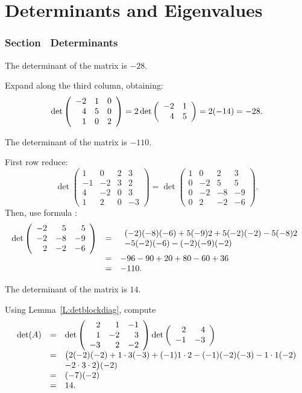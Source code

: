 \chapter{Determinants and Eigenvalues}

\subsection*{Section~\protect{\ref{S:det}} Determinants}

\ans The determinant of the matrix is $-28$.

\soln Expand along the third column, obtaining:
\[
\det\left(\begin{array}{rrr} -2 & 1 & 0 \\ 4 & 5 & 0 \\ 1 & 0 & 2\end{array}\right) = 2\det\left(\begin{array}{rr} -2 & 1\\ 4 &5\end{array}\right)
= 2(-14) = -28.
\]

\ans The determinant of the matrix is $-110$.

\soln First row reduce:
\[
\det\left(\begin{array}{rrrr}
1 & 0 & 2 & 3 \\ 
-1 & -2 & 3 & 2 \\
4 & -2 & 0 & 3 \\
1 & 2 & 0 & -3 \end{array}\right) =
\det\left(\begin{array}{rrrr}
1 & 0 & 2 & 3 \\ 
0 & -2 & 5 & 5 \\
0 & -2 & -8 & -9 \\
0 & 2 & -2 & -6 \end{array}\right).
\]
Then, use formula :
\[ \begin{array}{rcl}
\det\left(\begin{array}{rrr} -2 & 5 & 5 \\ -2 & -8 & -9 \\ 2 & -2 & -6\end{array}\right) & = &
\begin{array}{l}
(-2)(-8)(-6) + 5(-9)2 + 5(-2)(-2) - 5(-8)2 \\
- 5(-2)(-6) - (-2)(-9)(-2) \end{array} \\
& = & -96 - 90 + 20 + 80 - 60 + 36 \\
& = & -110.
\end{array}
\]

\ans The determinant of the matrix is $14$.

\soln Using Lemma~\ref{L:detblockdiag}, compute
\[ 
\begin{array}{rcl}
\det(A) & = & 
\det\left(\begin{array}{rrr} 2 & 1 & -1 \\ 1 & -2 & 3 \\ -3 & 2 & -2\end{array}\right)
\det\left(\begin{array}{rr} 2 & 4\\ -1 &-3\end{array}\right) \\
& = & \big(2(-2)(-2) + 1 \cdot 3(-3) + (-1)1 \cdot 2
- (-1)(-2)(-3) - 1 \cdot 1(-2) \\
& & - 2 \cdot 3 \cdot 2\big)
(-2) \\
& = & (-7)(-2) \\
& = & 14.
\end{array}
\]

